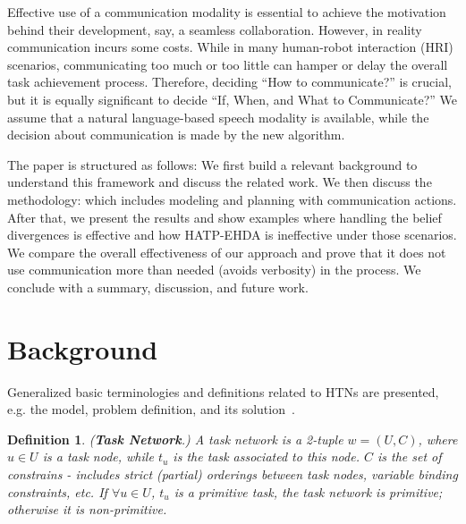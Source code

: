 \documentclass[letterpaper]{article} %
\newtheorem{definition}{Definition}
\begin{document}
Effective use of a communication modality is essential to achieve the motivation behind their development, say, a seamless collaboration. However, in reality communication incurs some costs. 
While in many human-robot interaction (HRI) scenarios, communicating too much or too little can hamper or delay the overall task achievement process. 
Therefore, deciding ``How to communicate?'' is crucial, but it is equally significant to decide ``If, When, and What to Communicate?'' 
We assume that a natural language-based speech modality is available, while 
the decision about communication is made by the new algorithm. 
%

The paper is structured as follows: We first build a relevant background to understand this framework and discuss the related work. We then discuss the methodology: which includes modeling and planning with communication actions. 
After that, we present the results and show examples where handling the belief divergences is effective and how HATP-EHDA is ineffective under those scenarios. We compare the overall effectiveness of our approach and prove that it does not use communication more than needed (avoids verbosity) in the process. We conclude with a summary, discussion, and future work.

\section{Background}

Generalized basic terminologies and definitions related to HTNs are presented, e.g. the model, problem definition, and its solution~\cite{naubooks0014222}.  
\begin{definition} 
(\textbf{Task Network}.) {A task network is a 2-tuple $w=(U,C)$, where $u\in U$ is a task node, while $t_u$ is the task associated to this node. $C$ is the set of constrains - includes strict (partial) orderings between task nodes, variable binding constraints, etc. If $\forall u \in U$, $t_u$ is a primitive task, the task network is primitive; otherwise it is non-primitive.}  
\end{definition}
\end{document}
